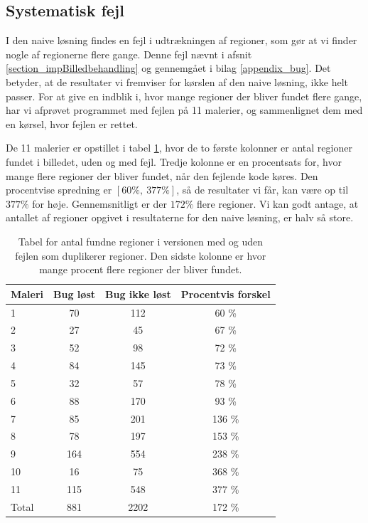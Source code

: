 {\subsection{Systematisk fejl\label{program_bug}}
I den naive løsning findes en fejl i udtrækningen af regioner, som gør
at vi finder nogle af
regionerne flere gange. Denne fejl nævnt i afsnit
\ref{section_impBilledbehandling} og gennemgået i bilag
\ref{appendix_bug}. Det betyder, at de resultater vi fremviser for kørslen
af den naive løsning, ikke helt passer. For at give en indblik i, hvor
mange regioner der bliver fundet flere gange, har vi afprøvet programmet med
fejlen på 11 malerier, og sammenlignet dem med en kørsel, hvor fejlen er
rettet.

De 11 malerier er opstillet i tabel \ref{bug_tabel}, hvor de to første
kolonner er antal regioner fundet i billedet, uden og med fejl.  Tredje
kolonne er en procentsats for, hvor mange flere regioner der bliver
fundet, når den fejlende kode køres. Den procentvise spredning er $[60
\%,~377 \%]$, så de resultater vi får, kan være op til $377\%$ for høje.
Gennemsnitligt er der $172 \%$ flere regioner. Vi kan godt antage, at
antallet af regioner opgivet i resultaterne for den naive løsning, er
halv så store.

\begin{table}[!h]
    \centering
    \begin{tabular}{|l|c|c|c|}
        \hline
  Maleri  & Bug løst 		& Bug ikke løst		& Procentvis forskel\\\hline
        1   & 70 			& 112 				& 60 \% \\
        2   & 27 			& 45 				& 67 \% \\
        3	& 52 			& 98 				& 72 \% \\
        4   & 84 			& 145 				& 73 \% \\
        5	& 32 			& 57 				& 78 \% \\
        6   & 88 			& 170 				& 93 \% \\
        7   & 85 			& 201 				& 136 \% \\
        8   & 78 			& 197 				& 153 \% \\
        9   & 164 			& 554 				& 238 \% \\
        10	& 16 			& 75 				& 368 \% \\
        11	& 115 			& 548 				& 377 \% \\\hline
	Total	& 881			& 2202				& 172 \% \\\hline
	  \end{tabular}
    \caption[]{Tabel for antal fundne regioner i versionen med og uden
    fejlen som duplikerer regioner. Den sidste kolonne er hvor mange
    procent flere regioner der bliver fundet.}
    \label{bug_tabel}
\end{table}

}

